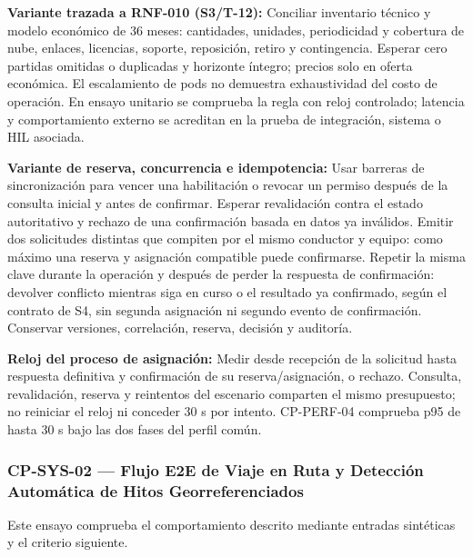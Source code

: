 \par\noindent\textbf{Variante trazada a RNF-010 (S3/T-12):} Conciliar inventario técnico y modelo económico de 36 meses: cantidades, unidades, periodicidad y cobertura de nube, enlaces, licencias, soporte, reposición, retiro y contingencia. Esperar cero partidas omitidas o duplicadas y horizonte íntegro; precios solo en oferta económica. El escalamiento de pods no demuestra exhaustividad del costo de operación. En ensayo unitario se comprueba la regla con reloj controlado; latencia y comportamiento externo se acreditan en la prueba de integración, sistema o HIL asociada.\par

\par\noindent\textbf{Variante de reserva, concurrencia e idempotencia:} Usar barreras de sincronización para vencer una habilitación o revocar un permiso después de la consulta inicial y antes de confirmar. Esperar revalidación contra el estado autoritativo y rechazo de una confirmación basada en datos ya inválidos. Emitir dos solicitudes distintas que compiten por el mismo conductor y equipo: como máximo una reserva y asignación compatible puede confirmarse. Repetir la misma clave durante la operación y después de perder la respuesta de confirmación: devolver conflicto mientras siga en curso o el resultado ya confirmado, según el contrato de S4, sin segunda asignación ni segundo evento de confirmación. Conservar versiones, correlación, reserva, decisión y auditoría.\par

\par\noindent\textbf{Reloj del proceso de asignación:} Medir desde recepción de la solicitud hasta respuesta definitiva y confirmación de su reserva/asignación, o rechazo. Consulta, revalidación, reserva y reintentos del escenario comparten el mismo presupuesto; no reiniciar el reloj ni conceder 30 s por intento. CP-PERF-04 comprueba p95 de hasta 30 s bajo las dos fases del perfil común.\par

\subsubsection*{CP-SYS-02 — Flujo E2E de Viaje en Ruta y Detección Automática de Hitos Georreferenciados}\label{sec:9-cp-sys-02}
Este ensayo comprueba el comportamiento descrito mediante entradas sintéticas y el criterio siguiente.

